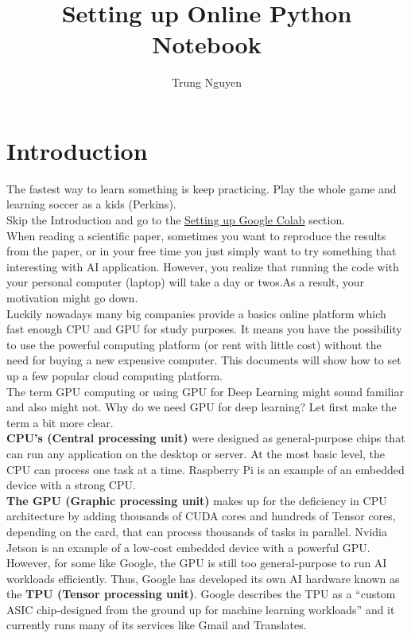\documentclass[a4paper,10pt]{article}
\title{Setting up Online Python Notebook}
\author{Trung Nguyen}
\date{}
\begin{document}
\maketitle
\tableofcontents
{}

\section{Introduction}

The fastest way to learn something is keep practicing. Play the whole game and learning soccer as a kids (Perkins).\\
 Skip the Introduction and go to the \hyperref[sec:Colab]{Setting up Google Colab} section.\\
When reading a scientific paper, sometimes you want to reproduce the results from the paper, or in your free time you just simply want to try something that interesting with AI application. However, you realize that running the code with your personal computer (laptop) will take a day or twos.As a result, your motivation might go down.\\
Luckily nowadays many big companies provide a basics online platform which fast enough CPU and GPU for study purposes. It means you have the possibility to use the powerful computing platform (or rent with little cost) without the need for buying a new expensive computer. 
This documents will show how to set up a few popular cloud computing platform.\\
The term GPU computing or using GPU for Deep Learning might sound familiar and also might not. Why do we need GPU for deep learning? Let first make the term a bit more clear.\\
\textbf{CPU’s (Central processing unit)} were designed as general-purpose chips that can run any application on the desktop or server. At the most basic level, the CPU can process one task at a time. Raspberry Pi is an example of an embedded device with a strong CPU.\\
\textbf{The GPU (Graphic processing unit)} makes up for the deficiency in CPU architecture by adding thousands of CUDA cores and hundreds of Tensor cores, depending on the card, that can process thousands of tasks in parallel. Nvidia Jetson is an example of a low-cost embedded device with a powerful GPU.
However, for some like Google, the GPU is still too general-purpose to run AI workloads efficiently. Thus, Google has developed its own AI hardware known as the \textbf{TPU (Tensor processing unit)}. Google describes the TPU as a “custom ASIC chip-designed from the ground up for machine learning workloads” and it currently runs many of its services like Gmail and Translates.\\
\end{document}
